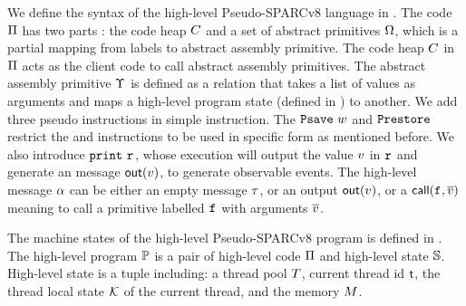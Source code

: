 We define the syntax of the high-level Pseudo-SPARCv8 language 
in \Fig{\ref{fig:syntax-of-concur-pseudo-sparc}}. 
The code $\Pi$ has two parts : 
the code heap $C$ 
and a set of abstract primitives $\Omega$, 
which is a partial mapping from labels to 
abstract assembly primitive. The code heap $C$ in $\Pi$ 
acts as the client code to 
call abstract assembly primitives. 
The abstract assembly primitive $\Upsilon$ 
is defined as a relation that takes a list of values 
as arguments and maps a high-level program state 
(defined in \Fig{\ref{fig:machine-state-concur-pseudo-sparc}}) 
to another. 
We add three pseudo instructions in simple instruction. 
The $\texttt{Psave} \ w$ 
and $\texttt{Prestore}$ restrict the \csave{} and \crestore{}
instructions to be used in specific form as 
mentioned before.  
We also introduce $\texttt{print} \ \texttt{r}_{}$, 
whose execution will output the value $v$ in $\texttt{r}_{}$ and 
generate an message $\textsf{out}({v})$, 
to generate observable events. 
The high-level message 
$\alpha$ can be either an empty message $\tau$, or an output 
$\textsf{out}({v})$, or a $\textsf{call}({\texttt{f}_{}, \overline{v}})$ meaning to 
call a primitive labelled $\texttt{f}_{}$ with arguments $\overline{v}$. 

The machine states of the high-level Pseudo-SPARCv8 program 
is defined in \Fig{\ref{fig:machine-state-concur-pseudo-sparc}}. 
The high-level program $\mathbb{P}$ is a pair of high-level code 
$\Pi$ and high-level state $\mathbb{S}$. High-level 
state is a tuple including: a thread pool $T$, 
current thread id $\textsf{t}$, the thread local state 
$\mathcal{K}$ of the current thread, and the memory $M$.

